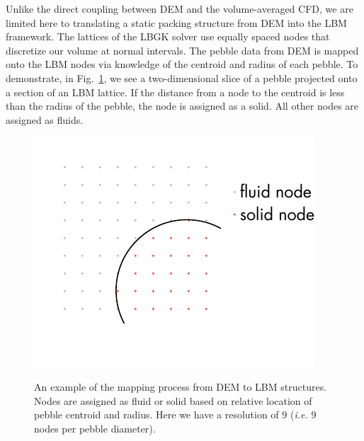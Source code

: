 Unlike the direct coupling between DEM and the volume-averaged CFD, we are limited here to translating a static packing structure from DEM into the LBM framework. The lattices of the LBGK solver use equally spaced nodes that discretize our volume at normal intervals. The pebble data from DEM is mapped onto the LBM nodes via knowledge of the centroid and radius of each pebble. To demonstrate, in Fig.~\ref{fig:dem-2-lbm-example1}, we see a two-dimensional slice of a pebble projected onto a section of an LBM lattice. If the distance from a node to the centroid is less than the radius of the pebble, the node is assigned as a solid. All other nodes are assigned as fluids.
\begin{figure}[ht]
	\centering
	\caption{An example of the mapping process from DEM to LBM structures. Nodes are assigned as fluid or solid based on relative location of pebble centroid and radius. Here we have a resolution of 9 (\textit{i.e.} 9 nodes per pebble diameter).}
	\includegraphics[width=\singleimagewidth]{chapters/figures/lbm/dem-to-lbm-mapping.pdf}\label{fig:dem-2-lbm-example1}
\end{figure}
